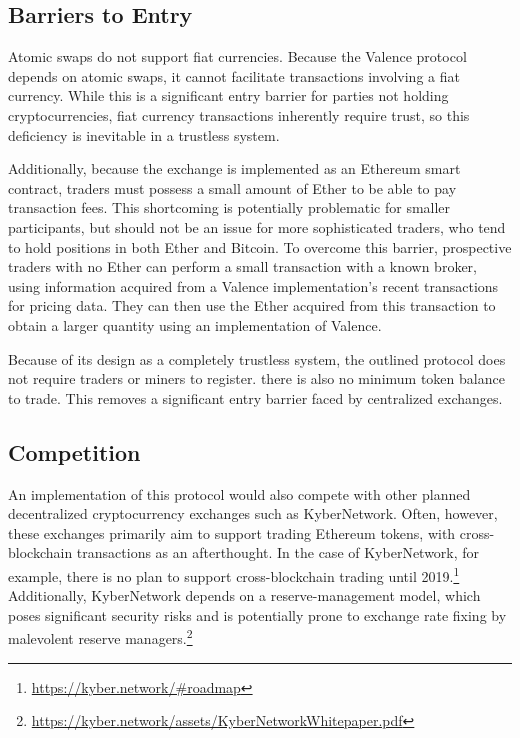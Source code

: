 \documentclass[a4paper]{article}
\begin{document}
  \subsection*{Barriers to Entry}
  	Atomic swaps do not support fiat currencies.
  	Because the Valence protocol depends on atomic swaps, it cannot
    facilitate transactions involving a fiat currency. While this is a
    significant entry barrier for parties not holding cryptocurrencies,
    fiat currency transactions inherently require trust, so this deficiency
    is inevitable in a trustless system.

    Additionally, because the exchange is implemented as an Ethereum smart
    contract, traders must possess a small amount of Ether to be able to pay
    transaction fees. This shortcoming is potentially problematic for
    smaller participants, but should not be an issue for more sophisticated
    traders, who tend to hold positions in both Ether and Bitcoin.
    To overcome this barrier, prospective traders with no Ether can
    perform a small transaction with a known broker, using information
    acquired from a Valence implementation's recent transactions for pricing
    data. They can then use the Ether acquired from this transaction to
    obtain a larger quantity using an implementation of Valence.

    Because of its design as a completely trustless system, the outlined
    protocol does not require traders or miners to register.
    there is also no minimum token balance to trade.
    This removes a
    significant entry barrier faced by centralized exchanges.
  \subsection*{Competition}
    An implementation of this protocol would also compete with other planned decentralized cryptocurrency exchanges such as KyberNetwork. Often, however, these exchanges primarily aim to support trading Ethereum tokens, with cross-blockchain transactions as an afterthought. In the case of KyberNetwork, for example, there is no plan to support cross-blockchain trading until 2019.\footnote[7]{\url{https://kyber.network/\#roadmap}} Additionally, KyberNetwork depends on a reserve-management model, which poses significant security risks and is potentially prone to exchange rate fixing by malevolent reserve managers.\footnote[8]
        {\url{https://kyber.network/assets/KyberNetworkWhitepaper.pdf}}
\end{document}
